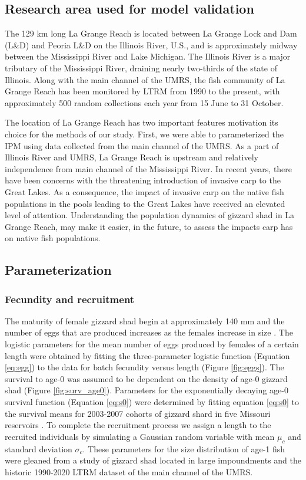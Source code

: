 \documentclass[preprint,review,12pt,authoryear]{elsarticle}
\begin{document}
\subsection{Research area used for model validation}
The 129 km long La Grange Reach is located between La Grange Lock and Dam (L\&D) and Peoria L\&D on the Illinois River, U.S., and is approximately midway between the Mississippi River and Lake Michigan. 
The Illinois River is a major tributary of the Mississippi River, draining nearly two-thirds of the state of Illinois. 
Along with the main channel of the UMRS, the fish community of La Grange Reach has been monitored by LTRM from 1990 to the present, with approximately 500 random collections each year from 15 June to 31 October. 

The location of La Grange Reach has two important features motivation its choice for the methods of our study. 
First, we were able to parameterized the IPM using data collected from the main channel of the UMRS.  
As a part of Illinois River and UMRS, La Grange Reach is upstream and relatively independence from main channel of the Mississippi River.  
In recent years, there have been concerns with the threatening introduction of invasive carp to the Great Lakes.  
As a consequence, the impact of invasive carp on the native fish populations in the pools leading to the Great Lakes have received an elevated level of attention.  
Understanding the population dynamics of gizzard shad in La Grange Reach, may make it easier, in the future, to assess the impacts carp has on native fish populations.

\subsection{Parameterization}
\subsubsection{Fecundity and recruitment}
The maturity of female gizzard shad begin at approximately 140 mm and the number of eggs that are produced increases as the females increase in size \citep{jons1997ovarian}. 
The logistic parameters for the mean number of eggs produced by females of a certain length were obtained by fitting the three-parameter logistic function (Equation \ref{eq:egg}) to the data for batch fecundity versus length \citep{jons1997ovarian} (Figure \ref{fig:eggs}). 
The survival to age-0 was assumed to be dependent on the density of age-0 gizzard shad (Figure \ref{fig:surv_age0}).  
Parameters for the exponentially decaying age-0 survival function (Equation \ref{eq:s0}) were determined by fitting equation \ref{eq:s0} to the survival means for 2003-2007 cohorts of gizzard shard in five Missouri reservoirs \citep{michaletz2010overwinter}.
To complete the recruitment process we assign a length to the recruited individuals by simulating a Gaussian random variable with mean $\mu_c$ and standard deviation $\sigma_c$.
These parameters for the size distribution of age-1 fish were gleaned from a study of gizzard shad located in large impoundments \citep{michaletz2017variation} and the historic 1990-2020 LTRM dataset of the main channel of the UMRS.
\end{document}
